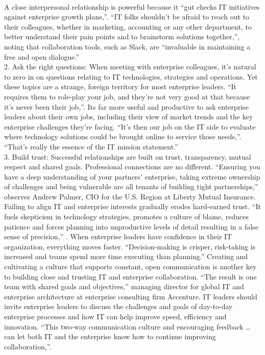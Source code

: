 \documentclass[12pt]{article}
\begin{document}
\\
A close interpersonal relationship is powerful because it “gut checks IT initiatives against enterprise growth plans,”. “IT folks shouldn’t be afraid to reach out to their colleagues, whether in marketing, accounting or any other department, to better understand their pain points and to brainstorm solutions together,”, noting that collaboration tools, such as Slack, are “invaluable in maintaining a free and open dialogue.”
\\
2. Ask the right questions: When meeting with enterprise colleagues, it’s natural to zero in on questions relating to IT technologies, strategies and operations. Yet these topics are a strange, foreign territory for most enterprise leaders. “It requires them to role-play your job, and they’re not very good at that because it’s never been their job,”. Its far more useful and productive to ask enterprise leaders about their own jobs, including their view of market trends and the key enterprise challenges they’re facing. “It’s then our job on the IT side to evaluate where technology solutions could be brought online to service those needs,”. “That’s really the essence of the IT mission statement.”
\\
3. Build trust: Successful relationships are built on trust, transparency, mutual respect and shared goals. Professional connections are no different. “Ensuring you have a deep understanding of your partners’ enterprise, taking extreme ownership of challenges and being vulnerable are all tenants of building tight partnerships,” observes Andrew Palmer, CIO for the U.S. Region at Liberty Mutual Insurance.\\
Failing to align IT and enterprise interests gradually erodes hard-earned trust. “It fuels skepticism in technology strategies, promotes a culture of blame, reduces patience and forces planning into unproductive levels of detail resulting in a false sense of precision,” . When enterprise leaders have confidence in their IT organization, everything moves faster. “Decision-making is crisper, risk-taking is increased and teams spend more time executing than planning.” Creating and cultivating a culture that supports constant, open communication is another key to building close and trusting IT and enterprise collaboration. “The result is one team with shared goals and objectives,” managing director for global IT and enterprise architecture at enterprise consulting firm Accenture. IT leaders should invite enterprise leaders to discuss the challenges and goals of day-to-day enterprise processes and how IT can help improve speed, efficiency and innovation. “This two-way communication culture and encouraging feedback … can let both IT and the enterprise know how to continue improving collaboration,”.
\end{document}
